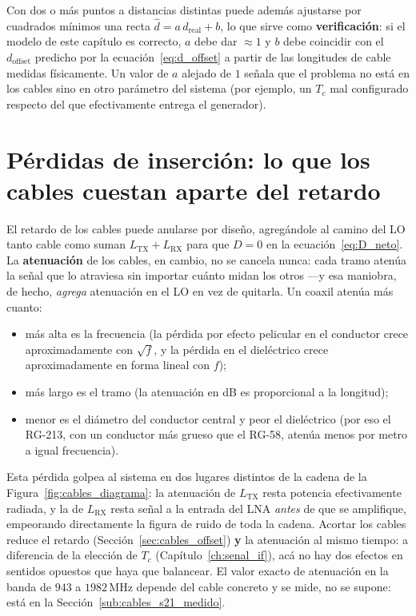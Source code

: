 \documentclass[12pt, a4paper, twoside]{report}
\begin{document}
Con dos o más puntos a distancias distintas puede además ajustarse por
cuadrados mínimos una recta $\hat d = a\,d_\text{real} + b$, lo que
sirve como \textbf{verificación}: si el modelo de este capítulo es
correcto, $a$ debe dar $\approx 1$ y $b$ debe coincidir con el
$d_\text{offset}$ predicho por la
ecuación~\eqref{eq:d_offset} a partir de las longitudes de cable
medidas físicamente. Un valor de $a$ alejado de $1$ señala que el
problema no está en los cables sino en otro parámetro del sistema (por
ejemplo, un $T_c$ mal configurado respecto del que efectivamente
entrega el generador).

\section{Pérdidas de inserción: lo que los cables cuestan aparte del retardo}
\label{sec:cables_perdidas}

El retardo de los cables puede anularse por diseño, agregándole al
camino del LO tanto cable como suman $L_\text{TX} + L_\text{RX}$ para
que $D = 0$ en la ecuación~\eqref{eq:D_neto}. La \textbf{atenuación} de
los cables, en cambio, no se cancela nunca: cada tramo atenúa la señal
que lo atraviesa sin importar cuánto midan los otros ---y esa maniobra,
de hecho, \emph{agrega} atenuación en el LO en vez de quitarla. Un
coaxil atenúa más cuanto:

\begin{itemize}
  \item más alta es la frecuencia (la pérdida por efecto pelicular en
    el conductor crece aproximadamente con $\sqrt{f}$, y la pérdida en
    el dieléctrico crece aproximadamente en forma lineal con $f$);
  \item más largo es el tramo (la atenuación en dB es proporcional a la
    longitud);
  \item menor es el diámetro del conductor central y peor el
    dieléctrico (por eso el RG-213, con un conductor más grueso que el
    RG-58, atenúa menos por metro a igual frecuencia).
\end{itemize}

Esta pérdida golpea al sistema en dos lugares distintos de la cadena
de la Figura~\ref{fig:cables_diagrama}: la atenuación de
$L_\text{TX}$ resta potencia efectivamente radiada, y la de
$L_\text{RX}$ resta señal a la entrada del LNA \emph{antes} de que se
amplifique, empeorando directamente la figura de ruido de toda la
cadena. Acortar los cables reduce el retardo (Sección~\ref{sec:cables_offset})
\textbf{y} la atenuación al mismo tiempo: a diferencia de la elección
de $T_c$ (Capítulo~\ref{ch:senal_if}), acá no hay dos efectos en
sentidos opuestos que haya que balancear. El valor exacto de
atenuación en la banda de $943$ a $1982\,\text{MHz}$ depende del cable
concreto y se mide, no se supone: está en la
Sección~\ref{sub:cables_s21_medido}.
\end{document}
